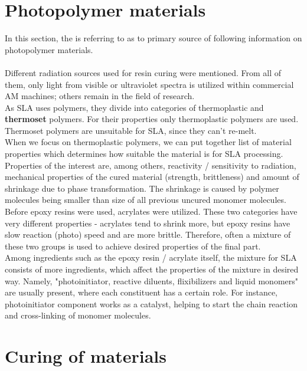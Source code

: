 \documentclass[a4paper, twoside, 11pt]{report}
\begin{document}
\section{Photopolymer materials}
In this section, the \cite{AMT} is referring to \cite{SLAmaterials} as to primary source of following information on photopolymer materials.\\
\\
Different radiation sources used for resin curing were mentioned. From all of them, only light from visible or ultraviolet spectra is utilized within commercial AM machines; others remain in the field of research.\\
As SLA uses polymers, they divide into categories of thermoplastic and \textbf{thermoset} polymers. For their properties only thermoplastic polymers are used. Thermoset polymers are unsuitable for SLA, since they can't re-melt.\\
When we focus on thermoplastic polymers, we can put together list of material properties which determines how suitable the material is for SLA processing. Properties of the interest are, among others, reactivity / sensitivity to radiation, mechanical properties of the cured material (strength, brittleness) and amount of shrinkage due to phase transformation. The shrinkage is caused  by polymer molecules being smaller than  size of all previous uncured monomer molecules.  Before epoxy resins were used, acrylates were utilized. These two categories have very different properties - acrylates tend to shrink more, but epoxy resins have slow reaction (photo) speed and are more brittle. Therefore, often a mixture of these two groups is used to achieve desired properties of the final part.\\
Among ingredients such as the epoxy resin / acrylate itself, the mixture for SLA consists of more ingredients, which affect the properties of the mixture in desired way. Namely, "photoinitiator, reactive diluents, flixibilizers and liquid monomers" \cite[p. ~67]{AMT} are usually present, where each constituent has a certain role. For instance, photoinitiator component works as a catalyst, helping to start the chain reaction and cross-linking of monomer molecules.
%
%
%
\section{Curing of materials}
%
\end{document}
